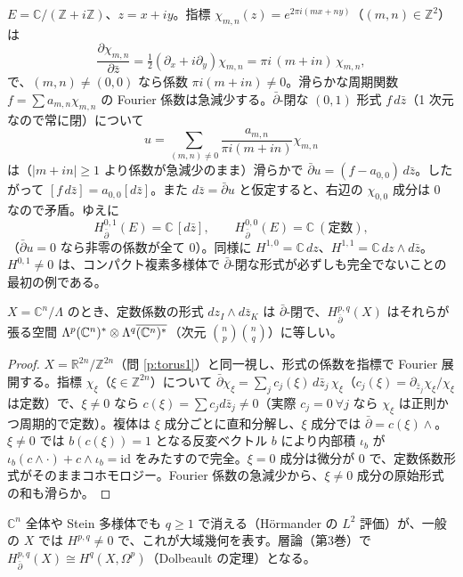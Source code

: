 \begin{ex}\label{ex:ell}\tP
$E=\mathbb C/(\mathbb Z+i\mathbb Z)$、$z=x+iy$。指標 $\chi_{m,n}(z)=e^{2\pi i(mx+ny)}$（$(m,n)\in\mathbb Z^2$）は
\[
\frac{\partial\chi_{m,n}}{\partial\bar z}=\tfrac12(\partial_x+i\partial_y)\chi_{m,n}=\pi i\,(m+in)\,\chi_{m,n},
\]
で、$(m,n)\ne(0,0)$ なら係数 $\pi i(m+in)\ne0$。滑らかな周期関数 $f=\sum a_{m,n}\chi_{m,n}$ の Fourier 係数は急減少する。$\bar\partial$-閉な $(0,1)$ 形式 $f\,d\bar z$（1 次元なので常に閉）について
\[
u=\sum_{(m,n)\ne0}\frac{a_{m,n}}{\pi i(m+in)}\chi_{m,n}
\]
は（$|m+in|\ge1$ より係数が急減少のまま）滑らかで $\bar\partial u=(f-a_{0,0})\,d\bar z$。したがって $[f\,d\bar z]=a_{0,0}[d\bar z]$。また $d\bar z=\bar\partial u$ と仮定すると、右辺の $\chi_{0,0}$ 成分は $0$ なので矛盾。ゆえに
\[
H^{0,1}_{\bar\partial}(E)=\mathbb C\,[d\bar z],\qquad H^{0,0}_{\bar\partial}(E)=\mathbb C\ (\text{定数}),
\]
（$\bar\partial u=0$ なら非零の係数が全て $0$）。同様に $H^{1,0}=\mathbb C\,dz$、$H^{1,1}=\mathbb C\,dz\wedge d\bar z$。$H^{0,1}\ne0$ は、コンパクト複素多様体で $\bar\partial$-閉な形式が必ずしも完全でないことの最初の例である。
\end{ex}
\begin{prop}\label{prop:torusdolb}\tP
$X=\mathbb C^n/\Lambda$ のとき、定数係数の形式 $dz_I\wedge d\bar z_K$ は $\bar\partial$-閉で、$H^{p,q}_{\bar\partial}(X)$ はそれらが張る空間 $\Lambda^p(\mathbb C^n)^*\otimes\Lambda^q\overline{(\mathbb C^n)^*}$（次元 $\binom np\binom nq$）に等しい。
\end{prop}
\begin{proof}
$X=\mathbb R^{2n}/\mathbb Z^{2n}$（問 \ref{p:torus1}）と同一視し、形式の係数を指標で Fourier 展開する。指標 $\chi_\xi$（$\xi\in\mathbb Z^{2n}$）について $\bar\partial\chi_\xi=\sum_jc_j(\xi)\,d\bar z_j\,\chi_\xi$（$c_j(\xi)=\partial_{\bar z_j}\chi_\xi/\chi_\xi$ は定数）で、$\xi\ne0$ なら $c(\xi)=\sum c_jd\bar z_j\ne0$（実際 $c_j=0\ \forall j$ なら $\chi_\xi$ は正則かつ周期的で定数）。複体は $\xi$ 成分ごとに直和分解し、$\xi$ 成分では $\bar\partial=c(\xi)\wedge$。$\xi\ne0$ では $b(c(\xi))=1$ となる反変ベクトル $b$ により内部積 $\iota_b$ が $\iota_b(c\wedge\cdot)+c\wedge\iota_b=\mathrm{id}$ をみたすので完全。$\xi=0$ 成分は微分が $0$ で、定数係数形式がそのままコホモロジー。Fourier 係数の急減少から、$\xi\ne0$ 成分の原始形式の和も滑らか。\qedhere
\end{proof}

$\mathbb C^n$ 全体や Stein 多様体でも $q\ge1$ で消える（Hörmander の $L^2$ 評価）が、一般の $X$ では $H^{p,q}\ne0$ で、これが大域幾何を表す。層論（第3巻）で $H^{p,q}_{\bar\partial}(X)\cong H^q(X,\Omega^p)$（Dolbeault の定理）となる。

